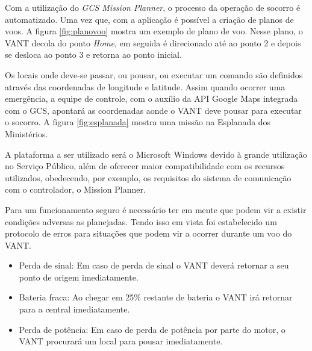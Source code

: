 Com a utilização do \textit{GCS Mission Planner}, o processo da operação de socorro é automatizado. 
Uma vez que, com a aplicação é possível a criação de planos de voos. 
A figura \ref{fig:planovoo} mostra um exemplo de plano de voo. 
Nesse plano, o VANT decola do ponto \textit{Home}, em seguida é direcionado até ao ponto 2 e depois 
se desloca ao ponto 3 e retorna ao ponto inicial.



Os locais onde deve-se passar, ou pousar, ou executar um comando são definidos através das coordenadas de longitude e latitude. Assim quando ocorrer uma emergência, a equipe de controle, com o auxílio da API Google Maps integrada com o GCS, apontará as coordenadas aonde o VANT deve pousar para executar o socorro. 
A figura \ref{fig:esplanada} mostra uma missão na Esplanada dos Ministérios.


A plataforma a ser utilizado será o Microsoft Windows devido à grande utilização no Serviço Público, 
além de oferecer maior compatibilidade com os recursos utilizados, obedecendo, por exemplo, os requisitos
do sistema de comunicação com o controlador, o Mission Planner. 

	
Para um funcionamento seguro é necessário ter em mente que podem vir a existir condições adversas as planejadas. Tendo isso em vista foi estabelecido um protocolo de erros para situações que podem vir a ocorrer durante um voo do VANT.

\begin{itemize}
 \item Perda de sinal: Em caso de perda de sinal o VANT deverá retornar a seu ponto de origem imediatamente.
 
 \item Bateria fraca: Ao chegar em 25\% restante de bateria o VANT irá retornar para a central imediatamente.

 \item Perda de potência: Em caso de perda de potência por parte do motor, o VANT procurará um local para pousar imediatamente.

\end{itemize}

